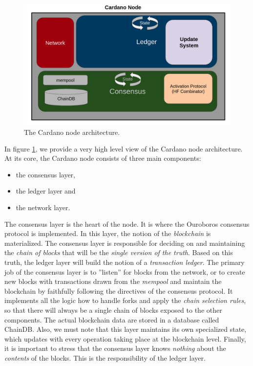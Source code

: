 \begin{figure}[h!] %
	\centering
	\includegraphics[width=0.8\columnwidth,
	keepaspectratio]{figures/cardano_node.png}
	\caption{The Cardano node architecture.}
	\label{fig:cardano_node}
\end{figure}

In figure \ref{fig:cardano_node}, we provide a very high level view of the 
Cardano node architecture. At its core, the Cardano node consists of three main 
components:
\begin{itemize}
	\item the consensus layer,
	\item the ledger layer and
	\item the network layer.
\end{itemize}
The consensus layer is the heart of the node. It is where the Ouroboros 
consensus protocol \cite{C:KRDO17} is implemented. In this layer, the notion of 
the \emph{blockchain} is materialized. The consensus layer is 
responsible for deciding on and maintaining the \emph{chain of blocks} that 
will be the \emph{single version of the truth}. Based on this truth, the ledger 
layer 
will build the notion of a \emph{transaction ledger}. The primary job of the 
consensus layer is to ''listen'' for blocks from the network, or to create new 
blocks with transactions drawn from the \emph{mempool} and maintain the 
blockchain by faithfully following the directives of the consensus protocol. It 
implements all the logic how to handle forks and apply the \emph{chain 
	selection 
	rules}, so 
that there will always be a single chain of blocks exposed to the other 
components. The actual blockchain data are stored in a database called ChainDB. 
Also, we must note that this layer maintains its own specialized state, which 
updates with every operation taking place at the blockchain level.
Finally, it is important to stress that the consensus layer knows 
\emph{nothing} about the 
\emph{contents} of the blocks. This is the responsibility of the ledger layer.


